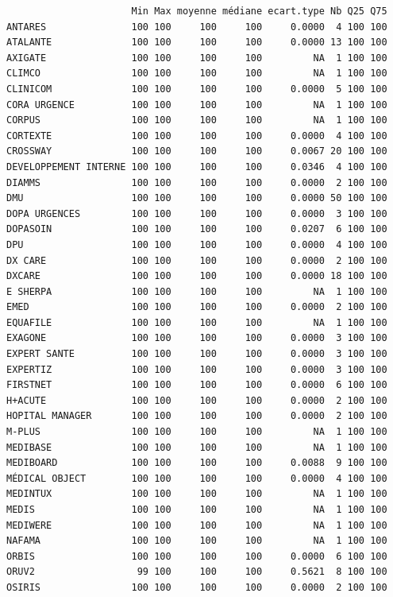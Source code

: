 \documentclass[]{article}
\begin{document}
\begin{verbatim}
                      Min Max moyenne médiane ecart.type Nb Q25 Q75
ANTARES               100 100     100     100     0.0000  4 100 100
ATALANTE              100 100     100     100     0.0000 13 100 100
AXIGATE               100 100     100     100         NA  1 100 100
CLIMCO                100 100     100     100         NA  1 100 100
CLINICOM              100 100     100     100     0.0000  5 100 100
CORA URGENCE          100 100     100     100         NA  1 100 100
CORPUS                100 100     100     100         NA  1 100 100
CORTEXTE              100 100     100     100     0.0000  4 100 100
CROSSWAY              100 100     100     100     0.0067 20 100 100
DEVELOPPEMENT INTERNE 100 100     100     100     0.0346  4 100 100
DIAMMS                100 100     100     100     0.0000  2 100 100
DMU                   100 100     100     100     0.0000 50 100 100
DOPA URGENCES         100 100     100     100     0.0000  3 100 100
DOPASOIN              100 100     100     100     0.0207  6 100 100
DPU                   100 100     100     100     0.0000  4 100 100
DX CARE               100 100     100     100     0.0000  2 100 100
DXCARE                100 100     100     100     0.0000 18 100 100
E SHERPA              100 100     100     100         NA  1 100 100
EMED                  100 100     100     100     0.0000  2 100 100
EQUAFILE              100 100     100     100         NA  1 100 100
EXAGONE               100 100     100     100     0.0000  3 100 100
EXPERT SANTE          100 100     100     100     0.0000  3 100 100
EXPERTIZ              100 100     100     100     0.0000  3 100 100
FIRSTNET              100 100     100     100     0.0000  6 100 100
H+ACUTE               100 100     100     100     0.0000  2 100 100
HOPITAL MANAGER       100 100     100     100     0.0000  2 100 100
M-PLUS                100 100     100     100         NA  1 100 100
MEDIBASE              100 100     100     100         NA  1 100 100
MEDIBOARD             100 100     100     100     0.0088  9 100 100
MÉDICAL OBJECT        100 100     100     100     0.0000  4 100 100
MEDINTUX              100 100     100     100         NA  1 100 100
MEDIS                 100 100     100     100         NA  1 100 100
MEDIWERE              100 100     100     100         NA  1 100 100
NAFAMA                100 100     100     100         NA  1 100 100
ORBIS                 100 100     100     100     0.0000  6 100 100
ORUV2                  99 100     100     100     0.5621  8 100 100
OSIRIS                100 100     100     100     0.0000  2 100 100

\end{verbatim}
\end{document}
